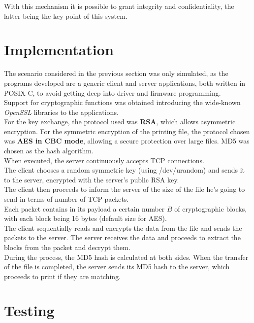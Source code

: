 \documentclass[]{report}
\begin{document}
With this mechanism it is possible to grant integrity and confidentiality, the latter being the key point of this system.


\section*{Implementation}

The scenario considered in the previous section was only simulated, as the programs developed are a generic client and server applications, both written in POSIX C, to avoid getting deep into driver and firmware programming.\\

Support for cryptographic functions was obtained introducing the wide-known \textit{OpenSSL} libraries to the applications.\\

For the key exchange, the protocol used was \textbf{RSA}, which allows asymmetric encryption.
For the symmetric encryption of the printing file, the protocol chosen was \textbf{AES in CBC mode}, allowing a secure protection over large files.
MD5 was chosen as the hash algorithm.\\

When executed, the server continuously accepts TCP connections.\\
The client chooses a random symmetric key (using /dev/urandom) and sends it to the server, encrypted with the server's public RSA key.\\
The client then proceeds to inform the server of the size of the file he's going to send in terms of number of TCP packets.\\
Each packet contains in its payload a certain number $B$ of cryptographic blocks, with each block being 16 bytes (default size for AES).\\
The client sequentially reads and encrypts the data from the file and sends the packets to the server. The server receives the data and proceeds to extract the blocks from the packet and decrypt them.\\
During the process, the MD5 hash is calculated at both sides. When the transfer of the file is completed, the server sends its MD5 hash to the server, which proceeds to print if they are matching. 

\newpage
\section*{Testing}
\end{document}
